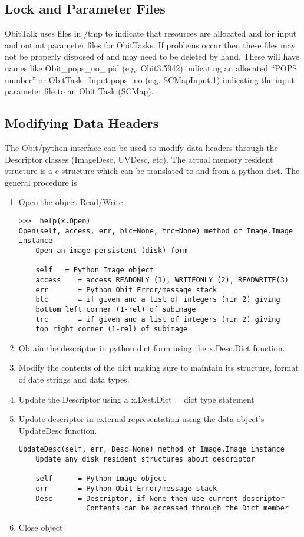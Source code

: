 \documentclass[11pt]{report}
\begin{document}
\subsection{Lock and Parameter Files}
ObitTalk uses files in /tmp to indicate that resources are allocated
and for input and output parameter files for ObitTasks.
If problems occur then these files may not be properly disposed of and
may need to be deleted by hand.
These will have names like Obit\_pops\_no\_.pid (e.g. Obit3.5942)
indicating an allocated ``POPS number'' or ObitTask\_Input.pops\_no
(e.g. SCMapInput.1) indicating the input parameter file to an Obit
Task (SCMap).

\subsection{Modifying Data Headers}
The Obit/python interface can be used to modify data headers through
the Descriptor classes (ImageDesc, UVDesc, etc).  
The actual memory resident structure is a c structure which can be
translated to and from a python dict.
The general procedure is 
\begin{enumerate}
\item Open the object Read/Write
\begin{verbatim}
>>>  help(x.Open)
Open(self, access, err, blc=None, trc=None) method of Image.Image instance
    Open an image persistent (disk) form
    
    self   = Python Image object
    access    = access READONLY (1), WRITEONLY (2), READWRITE(3)
    err       = Python Obit Error/message stack
    blc       = if given and a list of integers (min 2) giving
    bottom left corner (1-rel) of subimage
    trc       = if given and a list of integers (min 2) giving
    top right corner (1-rel) of subimage
\end{verbatim}
\item Obtain the descriptor in python dict form using the x.Desc.Dict
function.
\item Modify the contents of the dict making sure to maintain its
structure, format of date strings and data types.
\item Update the Descriptor using a x.Dest.Dict = dict type statement
\item Update descriptor in external representation using the data
  object's UpdateDesc function.
\begin{verbatim}
UpdateDesc(self, err, Desc=None) method of Image.Image instance
    Update any disk resident structures about descriptor
    
    self      = Python Image object
    err       = Python Obit Error/message stack
    Desc      = Descriptor, if None then use current descriptor
                Contents can be accessed through the Dict member
\end{verbatim}
\item Close object
\end{enumerate}
\end{document}

